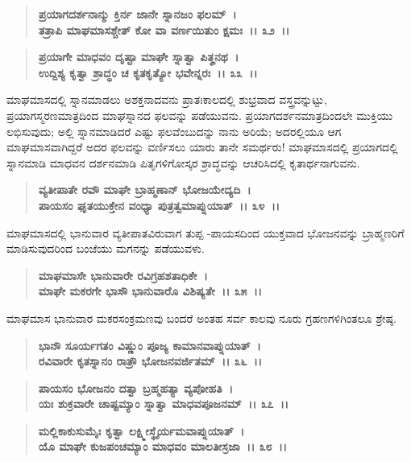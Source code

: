 \begin{verse}
\textbf{ಪ್ರಯಾಗದರ್ಶನಾನ್ಮು ಕ್ತಿರ್ನ ಜಾನೇ ಸ್ನಾನಜಂ ಫಲಮ್~।}\\\textbf{ತತ್ರಾಪಿ ಮಾಘಮಾಸಶ್ಚೇತ್ ಕೋ ವಾ ವರ್ಣಯಿತುಂ ಕ್ಷಮಃ~।। ೩೨~।। }
\end{verse}

\begin{verse}
\textbf{ಪ್ರಯಾಗೇ ಮಾಧವಂ ದೃಷ್ಟಾ ಮಾಘೇ ಸ್ನಾತ್ವಾ ಪಿತೄನಥ~।}\\\textbf{ಉದ್ದಿಶ್ಯ ಕೃತ್ವಾ ಶ್ರಾದ್ಧಂ ಚ ಕೃತಕೃತ್ಯೋ ಭವೇನ್ನರಃ~।। ೩೩~।।}
\end{verse}

ಮಾಘಮಾಸದಲ್ಲಿ ಸ್ನಾನಮಾಡಲು ಅಶಕ್ತನಾದವನು ಪ್ರಾತಃಕಾಲದಲ್ಲಿ ಶುಭ್ರವಾದ ವಸ್ತ್ರವನ್ನುಟ್ಟು, ಪ್ರಯಾಗಸ್ಮರಣಮಾತ್ರದಿಂದ ಮಾಘಸ್ನಾನದ ಫಲವನ್ನು ಪಡೆಯುವನು. ಪ್ರಯಾಗದರ್ಶನಮಾತ್ರದಿಂದಲೇ ಮುಕ್ತಿಯು ಲಭಿಸುವುದು; ಅಲ್ಲಿ ಸ್ನಾನಮಾಡಿದರೆ ಎಷ್ಟು ಫಲವೆಂಬುದನ್ನು ನಾನು ಅರಿಯೆ; ಅದರಲ್ಲಿಯೂ ಆಗ ಮಾಘಮಾಸವಾಗಿದ್ದರೆ ಅದರ ಫಲವನ್ನು ವರ್ಣಿಸಲು ಯಾರು ತಾನೇ ಸಮರ್ಥರು! ಮಾಘಮಾಸದಲ್ಲಿ ಪ್ರಯಾಗದಲ್ಲಿ ಸ್ನಾನಮಾಡಿ ಮಾಧವನ ದರ್ಶನಮಾಡಿ ಪಿತೃಗಳಿಗೋಸ್ಕರ ಶ್ರಾದ್ಧವನ್ನು ಆಚರಿಸಿದಲ್ಲಿ ಕೃತಾರ್ಥನಾಗುವನು.

\begin{verse}
\textbf{ವ್ಯತೀಪಾತೇ ರವೌ ಮಾಘೇ ಬ್ರಾಹ್ಮಣಾನ್ ಭೋಜಯೇದ್ಯದಿ~।}\\\textbf{ಪಾಯಸಂ ಘೃತಯುಕ್ತೇನ ವಂಧ್ಯಾ ಪುತ್ರತ್ವಮಾಪ್ನುಯಾತ್~।। ೩೪~।।}
\end{verse}

ಮಾಘಮಾಸದಲ್ಲಿ ಭಾನುವಾರ ವ್ಯತೀಪಾತವಿರುವಾಗ ತುಪ್ಪ -ಪಾಯಸದಿಂದ ಯುಕ್ತವಾದ ಭೋಜನವನ್ನು ಬ್ರಾಹ್ಮಣರಿಗೆ ಮಾಡಿಸುವುದರಿಂದ ಬಂಜೆಯು ಮಗನನ್ನು ಪಡೆಯುವಳು.

\begin{verse}
\textbf{ಮಾಘಮಾಸೇ ಭಾನುವಾರೇ ರವಿಗ್ರಹಶತಾಧಿಕೇ~।}\\\textbf{ಮಾಘೇ ಮಕರಗೇ ಭಾಸೌ ಭಾನುವಾರೊ ವಿಶಿಷ್ಯತೇ~।। ೩೫~।।}
\end{verse}

ಮಾಘಮಾಸ ಭಾನುವಾರ ಮಕರಸಂಕ್ರಮಣವು ಬಂದರೆ ಅಂತಹ ಸರ್ವ ಕಾಲವು ನೂರು ಗ್ರಹಣಗಳಿಗಿಂತಲೂ ಶ್ರೇಷ್ಠ.

\begin{verse}
\textbf{ಭಾನೌ ಸೂರ್ಯಗತಂ ವಿಷ್ಣುಂ ಪೂಜ್ಯ ಕಾಮಾನವಾಪ್ನುಯಾತ್~।}\\\textbf{ರವಿವಾರೇ ಕೃತಸ್ನಾನಂ ರಾತ್ರೌ ಭೋಜನವರ್ಜಿತಮ್~।। ೩೬~।।} 
\end{verse}

\begin{verse}
\textbf{ಪಾಯಸಂ ಭೋಜನಂ ದತ್ವಾ ಬ್ರಹ್ಮಹತ್ಯಾ ವ್ಯಪೋಹತಿ~।}\\\textbf{ಯಃ ಶುಕ್ರವಾರೇ ಚಾಷ್ಟಮ್ಯಾಂ ಸ್ನಾತ್ವಾ ಮಾಧವಪೂಜನಮ್~।। ೩೭~।। }
\end{verse}

\begin{verse}
\textbf{ಮಲ್ಲಿಕಾಕುಸುಮೈಃ ಕೃತ್ವಾ ಲಕ್ಷ್ಮೀಸ್ಥೈರ್ಯಮವಾಪ್ನುಯಾತ್~।}\\\textbf{ಯೊ ಮಾಘೇ ಕುಜಪಂಚಮ್ಯಾಂ ಮಾಧವಂ ಮಾಲತೀಸ್ರಜಾ~।। ೩೮~।।} 
\end{verse}

